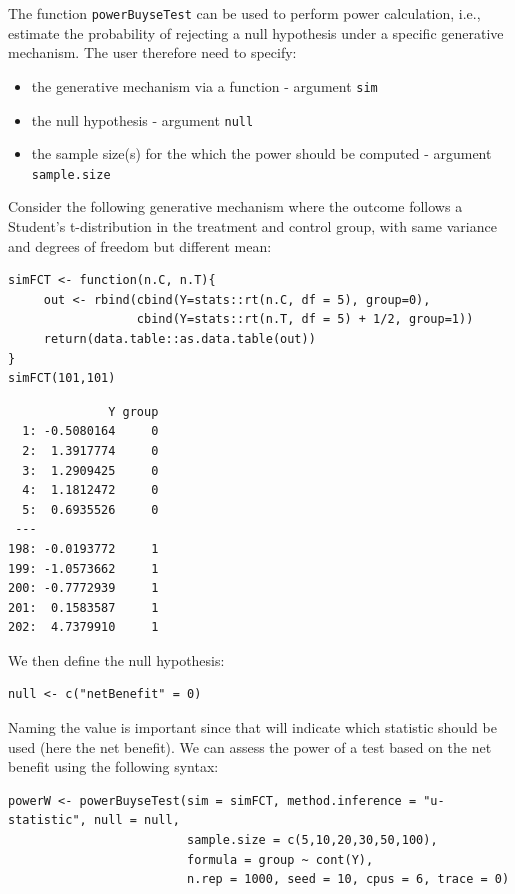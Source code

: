 \documentclass[12pt]{article}
\begin{document}
The function \texttt{powerBuyseTest} can be used to perform power
calculation, i.e., estimate the probability of rejecting a null
hypothesis under a specific generative mechanism. The user therefore
need to specify:
\begin{itemize}
\item the generative mechanism via a function \hfill - argument \texttt{sim}
\item the null hypothesis \hfill - argument \texttt{null}
\item the sample size(s) for the which the power should be computed  \hfill - argument \texttt{sample.size}
\end{itemize}

\bigskip

Consider the following generative mechanism where the outcome follows
a Student's t-distribution in the treatment and control group, with same
variance and degrees of freedom but different mean:
\lstset{language=r,label= ,caption= ,captionpos=b,numbers=none}
\begin{lstlisting}
simFCT <- function(n.C, n.T){
     out <- rbind(cbind(Y=stats::rt(n.C, df = 5), group=0),
                  cbind(Y=stats::rt(n.T, df = 5) + 1/2, group=1))
     return(data.table::as.data.table(out))
}
simFCT(101,101)
\end{lstlisting}

\begin{verbatim}
              Y group
  1: -0.5080164     0
  2:  1.3917774     0
  3:  1.2909425     0
  4:  1.1812472     0
  5:  0.6935526     0
 ---                 
198: -0.0193772     1
199: -1.0573662     1
200: -0.7772939     1
201:  0.1583587     1
202:  4.7379910     1
\end{verbatim}

We then define the null hypothesis:
\lstset{language=r,label= ,caption= ,captionpos=b,numbers=none}
\begin{lstlisting}
null <- c("netBenefit" = 0)
\end{lstlisting}

Naming the value is important since that will indicate which statistic
should be used (here the net benefit). We can assess the power of a
test based on the net benefit using the following syntax:
\lstset{language=r,label= ,caption= ,captionpos=b,numbers=none}
\begin{lstlisting}
powerW <- powerBuyseTest(sim = simFCT, method.inference = "u-statistic", null = null,
                         sample.size = c(5,10,20,30,50,100),                         
                         formula = group ~ cont(Y), 
                         n.rep = 1000, seed = 10, cpus = 6, trace = 0)
\end{lstlisting}
\end{document}
